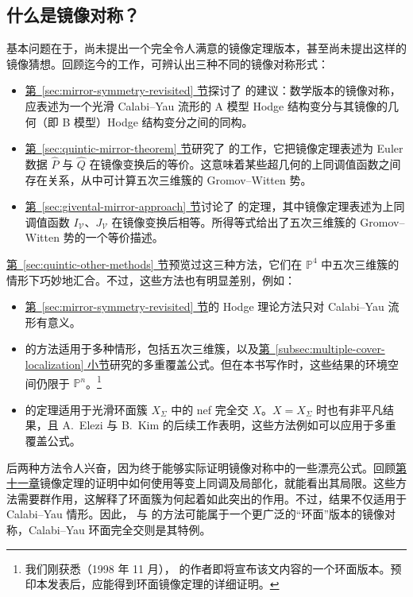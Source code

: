 \subsection{什么是镜像对称？}\label{subsec:what-is-mirror-symmetry}
基本问题在于，尚未提出一个完全令人满意的镜像定理版本，甚至尚未提出这样的镜像猜想。回顾迄今的工作，可辨认出三种不同的镜像对称形式：
\begin{itemize}
\item \hyperref[sec:mirror-symmetry-revisited]{第~\ref*{sec:mirror-symmetry-revisited} 节}探讨了  的建议：数学版本的镜像对称，应表述为一个光滑
Calabi--Yau 流形的 A 模型 Hodge 结构变分与其镜像的几何（即 B 模型）Hodge 结构变分之间的同构。
\item \hyperref[sec:quintic-mirror-theorem]{第~\ref*{sec:quintic-mirror-theorem} 节}研究了  的工作，它把镜像定理表述为 Euler 数据 $\widehat P$ 与 $\widehat Q$ 在镜像变换后的等价。这意味着某些超几何的上同调值函数之间存在关系，从中可计算五次三维簇的 Gromov--Witten 势。
\item \hyperref[sec:givental-mirror-approach]{第~\ref*{sec:givental-mirror-approach} 节}讨论了  的定理，其中镜像定理表述为上同调值函数 $I_{\mathcal V}$、$J_{\mathcal V}$ 在镜像变换后相等。所得等式给出了五次三维簇的 Gromov--Witten 势的一个等价描述。
\end{itemize}
\hyperref[sec:quintic-other-methods]{第~\ref*{sec:quintic-other-methods} 节}预览过这三种方法，它们在 $\mathbb P^4$ 中五次三维簇的情形下巧妙地汇合。不过，这些方法也有明显差别，例如：
\begin{itemize}
\item \hyperref[sec:mirror-symmetry-revisited]{第~\ref*{sec:mirror-symmetry-revisited} 节}的 Hodge 理论方法只对 Calabi--Yau 流形有意义。
\item {} 的方法适用于多种情形，包括五次三维簇，以及\hyperref[subsec:multiple-cover-localization]{第~\ref*{subsec:multiple-cover-localization} 小节}研究的多重覆盖公式。但在本书写作时，这些结果的环境空间仍限于 $\mathbb P^n$。\footnote{我们刚获悉（1998 年 11 月）， 的作者即将宣布该文内容的一个环面版本。预印本发表后，应能得到环面镜像定理的详细证明。}
\item {} 的定理适用于光滑环面簇 $X_\Sigma$ 中的 nef 完全交 $X$。$X=X_\Sigma$ 时也有非平凡结果，且 A.~Elezi 与 B.~Kim 的后续工作表明，这些方法例如可以应用于多重覆盖公式。
\end{itemize}
后两种方法令人兴奋，因为终于能够实际证明镜像对称中的一些漂亮公式。回顾\hyperref[chap:mirror-theorem]{第十一章}镜像定理的证明中如何使用等变上同调及局部化，就能看出其局限。这些方法需要群作用，这解释了环面簇为何起着如此突出的作用。不过，结果不仅适用于 Calabi--Yau 情形。因此， 与  的方法可能属于一个更广泛的“环面”版本的镜像对称，Calabi--Yau 环面完全交则是其特例。

